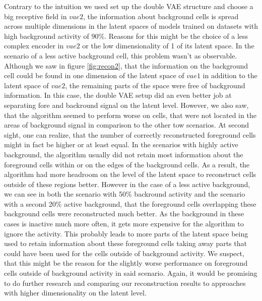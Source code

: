 \documentclass[12pt]{report}
\theoremstyle{definition}
\begin{document}
Contrary to the intuition we used set up the double VAE structure and choose a big receptive field in $vae2$, the information about background cells is spread across multiple dimensions in the latent spaces of models trained on datasets with high background activity of 90\%. Reasons for this might be the choice of a less complex encoder in $vae2$ or the low dimensionality of 1 of its latent space. 
In the scenario of a less active background cell, this problem wasn't as observable. Although we saw in figure \ref{fig:recon2}, that the information on the background cell could be found in one dimension of the latent space of $vae1$ in addition to the latent space of $vae2$, the remaining parts of the space were free of background information. In this case, the double VAE setup did an even better job at separating fore and backround signal on the latent level. However, we also saw, that the algorithm seemed to perform worse on cells, that were not located in the areas of background signal in comparison to the other tow scenarios. At second sight, one can realize, that the number of correctly reconstructed foreground cells might in fact be higher or at least equal. In the scenarios with highly active background, the algorithm usually did not retain most information about the foreground cells within or on the edges of the background cells. As a result, the algorithm had more headroom on the level of the latent space to reconstruct cells outside of these regions better. However in the case of a less active background, we can see in both the scenario with 50\% backround activity and the scenario with a second 20\% active background, that the foreground cells overlapping these background cells were reconstructed much better. As the background in these cases is inactive much more often, it gets more expensive for the algorithm to ignore the activity. This probably leads to more parts of the latent space being used to retain information about these foreground cells taking away parts that could have been used for the cells outside of background activity. We suspect, that this might be the reason for the slightly worse performance on foreground cells outside of background activity in said scenario. Again, it would be promising to do further research and comparing our reconstruction results to approaches with higher dimensionality on the latent level. 




 
\medskip
\end{document}
